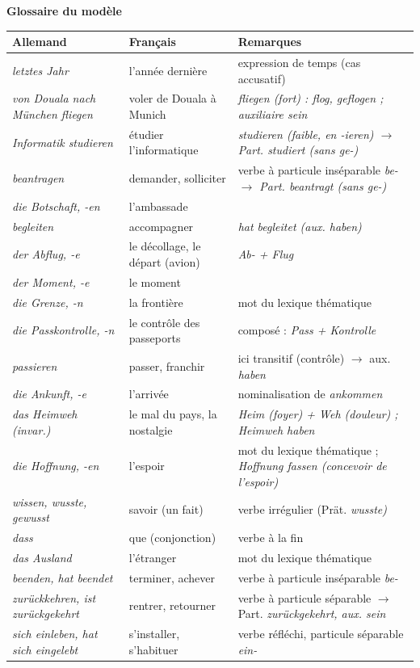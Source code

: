 \documentclass[11pt]{article}
\newcommand{\all}[1]{\ifmmode\text{\textit{#1}}\else\begingroup\selectlanguage{ngerman}\itshape #1\endgroup\fi}
\begin{document}
\textbf{Glossaire du modèle}
\begin{center}
\begin{tabularx}{\linewidth}{|X|X|X|}
\hline
\rowcolor{popblueL} \textbf{Allemand} & \textbf{Français} & \textbf{Remarques} \\
\hline
\all{letztes Jahr} & l'année dernière & expression de temps (cas accusatif) \\
\all{von Douala nach München fliegen} & voler de Douala à Munich & \all{fliegen} (fort) : \all{flog}, \all{geflogen} ; auxiliaire \all{sein} \\
\all{Informatik studieren} & étudier l'informatique & \all{studieren} (faible, en \all{-ieren}) $\rightarrow$ Part. \all{studiert} (sans \all{ge-}) \\
\all{beantragen} & demander, solliciter & verbe à particule inséparable \all{be-} $\rightarrow$ Part. \all{beantragt} (sans \all{ge-}) \\
\all{die Botschaft, -en} & l'ambassade & \\
\all{begleiten} & accompagner & \all{hat begleitet} (aux. \all{haben}) \\
\all{der Abflug, -e} & le décollage, le départ (avion) & \all{Ab-} + \all{Flug} \\
\all{der Moment, -e} & le moment & \\
\all{die Grenze, -n} & la frontière & mot du lexique thématique \\
\all{die Passkontrolle, -n} & le contrôle des passeports & composé : \all{Pass} + \all{Kontrolle} \\
\all{passieren} & passer, franchir & ici transitif (contrôle) $\rightarrow$ aux. \all{haben} \\
\all{die Ankunft, -e} & l'arrivée & nominalisation de \all{ankommen} \\
\all{das Heimweh} (invar.) & le mal du pays, la nostalgie & \all{Heim} (foyer) + \all{Weh} (douleur) ; \all{Heimweh haben} \\
\all{die Hoffnung, -en} & l'espoir & mot du lexique thématique ; \all{Hoffnung fassen} (concevoir de l'espoir) \\
\all{wissen, wusste, gewusst} & savoir (un fait) & verbe irrégulier (Prät. \all{wusste}) \\
\all{dass} & que (conjonction) & verbe à la fin \\
\all{das Ausland} & l'étranger & mot du lexique thématique \\
\all{beenden, hat beendet} & terminer, achever & verbe à particule inséparable \all{be-} \\
\all{zurückkehren, ist zurückgekehrt} & rentrer, retourner & verbe à particule séparable $\rightarrow$ Part. \all{zurückgekehrt}, aux. \all{sein} \\
\all{sich einleben, hat sich eingelebt} & s'installer, s'habituer & verbe réfléchi, particule séparable \all{ein-} \\
\hline
\end{tabularx}
\end{center}
\end{document}
